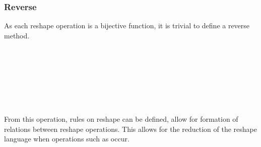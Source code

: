 \subsubsection{Reverse}
As each reshape operation is a bijective function, it is trivial to define a reverse
method.
\begin{code}%
%
\>[2]\AgdaSpace{}%
\AgdaSymbol{:}\AgdaSpace{}%
\AgdaSpace{}%
\AgdaSpace{}%
\AgdaSpace{}%
\AgdaSpace{}%
\AgdaSpace{}%
\AgdaSpace{}%
\<%
\\
%
\>[2]\AgdaSpace{}%
\AgdaSpace{}%
\AgdaSymbol{=}\AgdaSpace{}%
\<%
\\
%
\>[2]\AgdaSpace{}%
\AgdaSymbol{(}\AgdaSpace{}%
\AgdaSpace{}%
\AgdaSymbol{)}\AgdaSpace{}%
\AgdaSymbol{=}\AgdaSpace{}%
\AgdaSpace{}%
\AgdaSpace{}%
\AgdaSpace{}%
\AgdaSpace{}%
\<%
\\
%
\>[2]\AgdaSpace{}%
\AgdaSymbol{(}\AgdaSpace{}%
\AgdaSpace{}%
\AgdaSymbol{)}\AgdaSpace{}%
\AgdaSymbol{=}\AgdaSpace{}%
\AgdaSpace{}%
\AgdaSpace{}%
\AgdaSpace{}%
\AgdaSpace{}%
\<%
\\
%
\>[2]\AgdaSpace{}%
\AgdaSpace{}%
\AgdaSymbol{=}\AgdaSpace{}%
\<%
\\
%
\>[2]\AgdaSpace{}%
\AgdaSpace{}%
\AgdaSymbol{=}\AgdaSpace{}%
\<%
\\
%
\>[2]\AgdaSpace{}%
\AgdaSpace{}%
\AgdaSymbol{=}\AgdaSpace{}%
\<%
\end{code}
From this operation, rules on reshape can be defined, allow for formation of
relations between reshape operations.
This allows for the reduction of the reshape language when operations such as 
 occur.
\begin{code}[hide]%
%
\>[2]\<%
\end{code}

